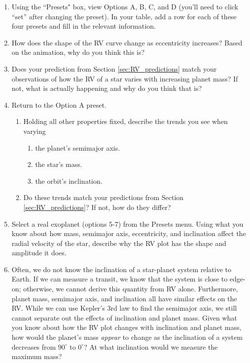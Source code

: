 \documentclass[11pt]{article}
\begin{document}
\begin{enumerate}[resume]
    \item Using the ``Presets" box, view Options A, B, C, and D (you'll need to click ``set'' after changing the preset). In your table, add a row for each of these four presets and fill in the relevant information.

    \item How does the shape of the RV curve change as eccentricity increases? Based on the animation, why do you think this is?
        
    \item Does your prediction from Section \ref{sec:RV_predictions} match your observations of how the RV of a star varies with increasing planet mass? If not, what is actually happening and why do you think that is?
    
    \item Return to the Option A preset. 
    \begin{enumerate}
        \item Holding all other properties fixed, describe the trends you see when varying
        \begin{enumerate}
            \item the planet's semimajor axis.
            \item the star's mass.
            \item the orbit's inclination.
        \end{enumerate}
        
        \item Do these trends match your predictions from Section \ref{sec:RV_predictions}? If not, how do they differ?
    \end{enumerate}
    
    \item Select a real exoplanet (options 5-7) from the Presets menu. Using what you know about how mass, semimajor axis, eccentricity, and inclination affect the radial velocity of the star, describe why the RV plot has the shape and amplitude it does.
    
    \item Often, we do not know the inclination of a star-planet system relative to Earth. If we can measure a transit, we know that the system is close to edge-on; otherwise, we cannot derive this quantity from RV alone. Furthermore, planet mass, semimajor axis, and inclination all have similar effects on the RV. While we can use Kepler's 3rd law to find the semimajor axis, we still cannot separate out the effects of inclination and planet mass. Given what you know about how the RV plot changes with inclination and planet mass, how would the planet's mass \emph{appear} to change as the inclination of a system decreases from $90^\circ$ to $0^\circ$? At what inclination would we measure the maximum mass?
\end{enumerate}
\end{document}
